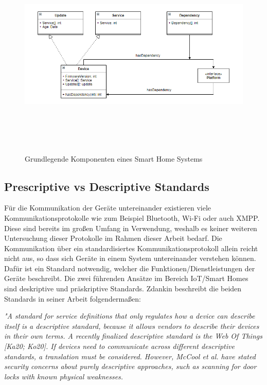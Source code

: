 \begin{figure}[h]
\hspace*{-0,5cm}                                                           
\includegraphics[width=16cm,height=10cm]{"images/System Model"}
  \caption{Grundlegende Komponenten eines Smart Home Systems}
  \label{fig:Prob1:MEA}
\end{figure}


\newpage
\subsection{Prescriptive vs Descriptive Standards}
Für die Kommunikation der Geräte untereinander existieren viele Kommunikationsprotokolle wie zum Beispiel Bluetooth,
Wi-Fi oder auch XMPP. Diese sind bereits im großen Umfang in Verwendung, weshalb es keiner weiteren
Untersuchung dieser Protokolle im Rahmen dieser Arbeit bedarf.
Die Kommunikation über ein standardisiertes Kommunikationsprotokoll allein reicht nicht aus, so dass sich Geräte in einem System untereinander
verstehen können.
Dafür ist ein Standard notwendig, welcher die Funktionen/Dienstleistungen der Geräte beschreibt.
Die zwei führenden Ansätze im Bereich IoT/Smart Homes sind deskriptive und präskriptive Standards.
Zdankin beschreibt die beiden Standards in seiner Arbeit folgendermaßen:

\textit{"A standard for service definitions that only regulates how a device can describe itself is
a descriptive standard, because it allows vendors to describe their devices in their own
terms. A recently finalized descriptive standard is the Web Of Things [Ka20; Ko20]. If
devices need to communicate across different descriptive standards, a translation must be
considered. However, McCool et al. have stated security concerns about purely descriptive
approaches, such as scanning for door locks with known physical weaknesses.}


